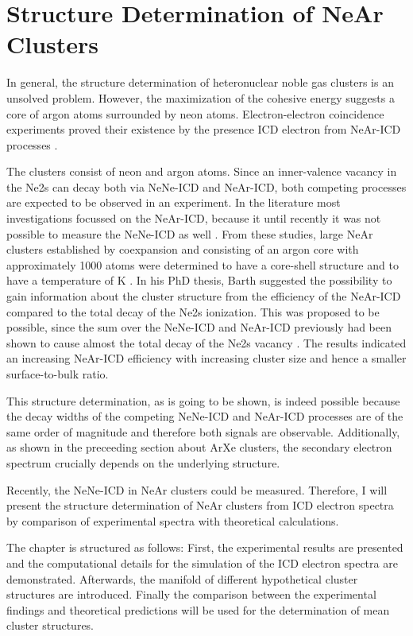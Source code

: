 \section{Structure Determination of NeAr Clusters}

In general, the structure determination of heteronuclear noble gas
clusters is an unsolved problem. However, the maximization of the cohesive
energy suggests a core of argon atoms surrounded by neon atoms.
Electron-electron coincidence experiments proved their existence by the
presence ICD electron from NeAr-ICD processes \cite{}.

The clusters consist of neon and argon atoms. Since an inner-valence vacancy in
the Ne2s can decay both via NeNe-ICD and NeAr-ICD, both competing processes
are expected to be observed in an experiment. In the literature most
investigations focussed on the NeAr-ICD, because it until recently it was not
possible to measure the NeNe-ICD as well \cite{Fasshauer14_1}.
From these studies, large NeAr clusters established by coexpansion and
consisting of an argon core with
approximately 1000 atoms were determined to have a core-shell structure
\cite{xyz06,Lundwall07,Barth_diss}
and to have a temperature of \unit[40 -- 50]{K} \cite{Barth_diss}.
In his PhD thesis, Barth suggested the possibility to gain information about
the cluster structure from the efficiency of the NeAr-ICD compared to the
total decay of the Ne2s ionization. This was proposed to be possible, since
the sum over the NeNe-ICD and NeAr-ICD previously had been shown to
cause almost the total decay of the Ne2s vacancy \cite{Marburgerxy}.
The results indicated an increasing NeAr-ICD efficiency with increasing
cluster size and hence a smaller surface-to-bulk ratio.

This structure determination, as is going to be shown, is indeed possible
because the decay widths of the competing NeNe-ICD and NeAr-ICD processes
are of the same order
of magnitude and therefore both signals are observable. Additionally, as shown
in the preceeding section about ArXe clusters, the secondary electron spectrum
crucially depends on the underlying structure.

Recently, the NeNe-ICD in NeAr clusters could be measured. Therefore, I will
present the structure determination of NeAr clusters from ICD electron
spectra by comparison of experimental spectra with theoretical calculations.

The chapter is structured as follows: First, the experimental results are
presented and the computational details for the simulation of the ICD
electron spectra are demonstrated. Afterwards, the manifold of different 
hypothetical cluster structures are introduced. Finally the comparison
between the experimental findings and theoretical predictions will be used
for the determination of mean cluster structures.


